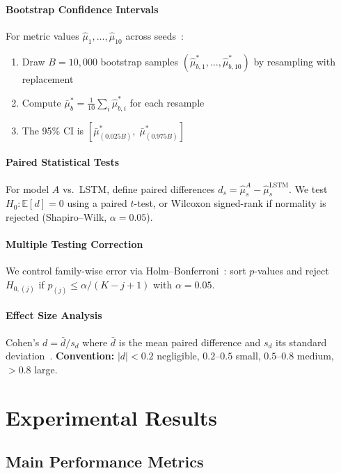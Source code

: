 \documentclass[11pt,oneside]{report}
\newcommand{\E}{\mathbb{E}}
\begin{document}
\subsubsection{Bootstrap Confidence Intervals}

For metric values $\hat\mu_1, \ldots, \hat\mu_{10}$ across seeds~\citep{efron1979bootstrap}:
\begin{enumerate}[noitemsep]
    \item Draw $B = 10{,}000$ bootstrap samples $(\hat\mu^*_{b,1}, \ldots, \hat\mu^*_{b,10})$ by resampling with replacement
    \item Compute $\bar\mu^*_b = \frac{1}{10}\sum_i \hat\mu^*_{b,i}$ for each resample
    \item The 95\% CI is $[\bar\mu^*_{(0.025B)},\; \bar\mu^*_{(0.975B)}]$
\end{enumerate}
\subsubsection{Paired Statistical Tests}

For model $A$ vs.\ LSTM, define paired differences $d_s = \hat\mu_s^A - \hat\mu_s^{\mathrm{LSTM}}$. We test $H_0:\E[d]=0$ using a paired $t$-test, or Wilcoxon signed-rank if normality is rejected (Shapiro--Wilk, $\alpha=0.05$).

\subsubsection{Multiple Testing Correction}

We control family-wise error via Holm--Bonferroni~\citep{holm1979simple}: sort $p$-values and reject $H_{0,(j)}$ if $p_{(j)} \le \alpha/(K-j+1)$ with $\alpha=0.05$.

\subsubsection{Effect Size Analysis}

Cohen's $d = \bar{d} / s_d$ where $\bar{d}$ is the mean paired difference and $s_d$ its standard deviation~\citep{cohen1988statistical}. \textbf{Convention:} $|d| < 0.2$ negligible, $0.2$--$0.5$ small, $0.5$--$0.8$ medium, $> 0.8$ large.
\chapter{Experimental Results}
\label{sec:results}

\section{Main Performance Metrics}
\end{document}
